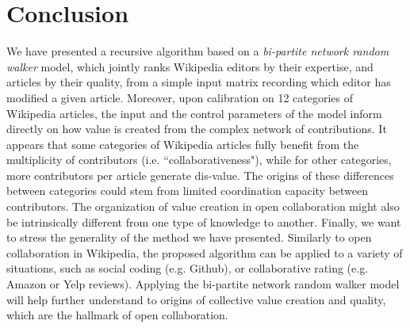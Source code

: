 \section{Conclusion}
We have presented a recursive algorithm based on a {\it bi-partite network random walker} model, which jointly ranks Wikipedia editors by their expertise, and articles by their quality, from a simple input matrix recording which editor has modified a given article. Moreover, upon calibration on 12 categories of Wikipedia articles, the input and the control parameters of the model inform directly on how value is created from the complex network of contributions. It appears that some categories of Wikipedia articles fully benefit from the multiplicity of contributors (i.e. ``collaborativeness"), while for other categories, more contributors per article generate dis-value. The origins of these differences between categories could stem from limited coordination capacity between contributors. The organization of value creation in open collaboration might also be intrinsically different from one type of knowledge to another. Finally, we want to stress the generality of the method we have presented. Similarly to open collaboration in Wikipedia, the proposed algorithm can be applied to a variety of situations, such as social coding (e.g. Github), or collaborative rating (e.g. Amazon or Yelp reviews). Applying the bi-partite network random walker model will help further understand to origins of collective value creation and quality, which are the hallmark of open collaboration.